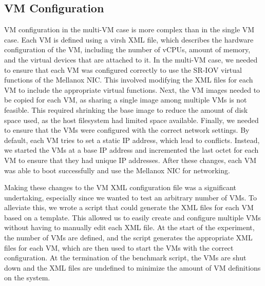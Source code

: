 \subsection{VM Configuration}
VM configuration in the multi-VM case is more complex than in the single VM case. Each VM is defined using a virsh XML file, which describes the hardware configuration of the VM, including the number of vCPUs, amount of memory, and the virtual devices that are attached to it. In the multi-VM case, we needed to ensure that each VM was configured correctly to use the SR-IOV virtual functions of the Mellanox NIC. This involved modifying the XML files for each VM to include the appropriate virtual functions. Next, the VM images needed to be copied for each VM, as sharing a single image among multiple VMs is not feasible. This required shrinking the base image to reduce the amount of disk space used, as the host filesystem had limited space available. Finally, we needed to ensure that the VMs were configured with the correct network settings. By default, each VM tries to set a static IP address, which lead to conflicts. Instead, we started the VMs at a base IP address and incremented the last octet for each VM to ensure that they had unique IP addresses. After these changes, each VM was able to boot successfully and use the Mellanox NIC for networking.

Making these changes to the VM XML configuration file was a significant undertaking, especially since we wanted to test an arbitrary number of VMs. To alleviate this, we wrote a script that could generate the XML files for each VM based on a template. This allowed us to easily create and configure multiple VMs without having to manually edit each XML file. At the start of the experiment, the number of VMs are defined, and the script generates the appropriate XML files for each VM, which are then used to start the VMs with the correct configuration. At the termination of the benchmark script, the VMs are shut down and the XML files are undefined to minimize the amount of VM definitions on the system.


